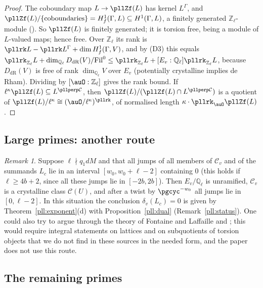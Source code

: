 \documentclass[10pt]{amsart}
\theoremstyle{definition}
\theoremstyle{remark}
\newtheorem{remark}[theorem]{Remark}
\newcommand{\Z}{\mathbb Z}
\newcommand{\Q}{\mathbb Q}
\begin{document}
\begin{proof}
The coboundary map $L\to\pllZf(L)$ has kernel $L^\Gamma$, and $\pllZf(L)/\{\text{coboundaries}\}
=H^1_f(\Gamma,L)\subseteq H^1(\Gamma,L)$, a finitely generated $\Z_\ell$-module
(\cite[Theorem~7.1.8(iii) and Corollary~2.7.10]{NSW}). So $\pllZf(L)$ is finitely generated; it
is torsion free, being a module of $L$-valued maps; hence free. Over $\Z_\ell$ its rank is
$\pllrk L-\pllrk L^\Gamma+\dim H^1_f(\Gamma,V)$, and by (D3) this equals
$\pllrk_{\Z_\ell}L+\dim_{\Q_\ell}D_{\mathrm{dR}}(V)/\mathrm{Fil}^0\le\pllrk_{\Z_\ell}L+
[E_v:\Q_\ell]\pllrk_{\Z_\ell}L$, because $D_{\mathrm{dR}}(V)$ is free of rank $\dim_{\Q_\ell}V$
over $E_v$ (potentially crystalline implies de Rham). Dividing by $[\auO:\Z_\ell]$ gives the rank
bound. If $\ell^\kappa\pllZf(L)\subseteq L^{\pllperp\mathcal C}$, then $\pllZf(L)/(\pllZf(L)\cap
L^{\pllperp\mathcal C})$ is a quotient of $\pllZf(L)/\ell^\kappa\cong(\auO/\ell^\kappa)^{\pllrk}$, of
normalised length $\kappa\cdot\pllrk_\auO\pllZf(L)$.
\end{proof}

\subsection{Large primes: another route}\label{pll:ss-FL}

\begin{remark}\label{pll:FL}
Suppose $\ell\nmid q_1dM$ and that all jumps of all members of $\mathcal C_v$ and of the summands
$L_c$ lie in an interval $[w_0,w_0+\ell-2]$ containing $0$ (this holds if $\ell\ge4b+2$, since all
these jumps lie in $[-2b,2b]$). Then $E_v/\Q_\ell$ is unramified, $\mathcal C_v$ is a crystalline
class $\mathcal C(U)$, and after a twist by $\pgcyc^{-w_0}$ all jumps lie in $[0,\ell-2]$. In this
situation the conclusion $\delta_v(L_c)=0$ is given by Theorem~\ref{pll:exponent}(d) with
Proposition~\ref{pll:dual} (Remark~\ref{pll:status}). One could also try to argue through the
theory of Fontaine and Laffaille \cite{FontaineLaffaille} and \cite[\S4]{BlochKato}; this would
require integral statements on lattices and on subquotients of torsion objects that we do not find
in these sources in the needed form, and the paper does not use this route.
\end{remark}

\subsection{The remaining primes}\label{pll:ss-gap}
\end{document}

